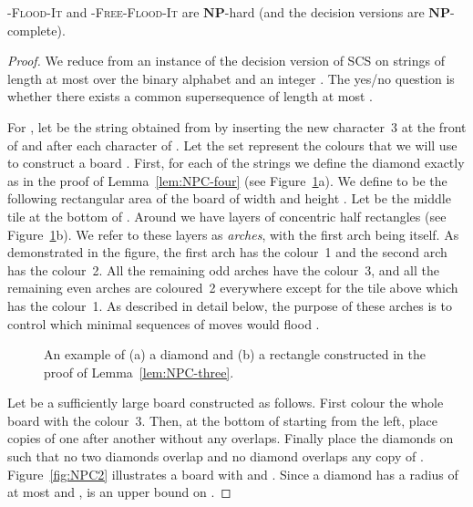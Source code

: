 \documentclass[a4paper,11pt]{llncs}
\newcommand{\pgfgraphic}[1]{}
\newcounter{l}
\newcommand{\NPtime}{\ensuremath{\mathbf{NP}}}
\newcommand{\Coloroid}[1]{-\textsc{Flood-It}}
\newcommand{\ColoroidFree}[1]{-\textsc{Free-Flood-It}}
\newcommand{\SCS}{\textsc{SCS}}
\newcommand{\recdim}[2]{}
\begin{document}
\begin{lemma}
    \label{lem:NPC-three}
    \Coloroid{3} and \ColoroidFree{3} are \NPtime-hard (and the decision versions are \NPtime-complete).
\end{lemma}
\begin{proof}
    We reduce from an instance of the decision version of \SCS{} on  strings  of length at most  over the binary alphabet  and an integer . The yes/no question is whether there exists a common supersequence of length at most .

    For , let  be the string obtained from  by inserting the new character~3 at the front of  and after each character of . Let the set  represent the colours that we will use to construct a board . First, for each of the  strings  we define the diamond  exactly as in the proof of Lemma~\ref{lem:NPC-four} (see Figure~\ref{fig:NPC}a). We define  to be the following rectangular area of the board of width  and height . Let  be the middle tile at the bottom of . Around  we have layers of concentric half rectangles (see Figure~\ref{fig:NPC}b). We refer to these layers as \emph{arches}, with the first arch being  itself. As demonstrated in the figure, the first arch has the colour~1 and the second arch has the colour~2. All the remaining odd arches have the colour~3, and all the remaining even arches are coloured~2 everywhere except for the tile above  which has the colour~1. As described in detail below, the purpose of these arches is to control which minimal sequences of moves would flood .


\begin{figure}[t]
\centering
	\pgfgraphic{graphic-npc}
\caption{ An example of (a) a diamond and (b) a rectangle constructed in the proof of Lemma~\ref{lem:NPC-three}.}
\label{fig:NPC}
\end{figure}

    Let  be a sufficiently large \recdim{n}{n} board constructed as follows. First colour the whole board with the colour~3. Then, at the bottom of  starting from the left, place  copies of  one after another without any overlaps. Finally place the  diamonds  on  such that no two diamonds overlap and no diamond overlaps any copy of . Figure~\ref{fig:NPC2} illustrates a board  with  and . Since a diamond has a radius of at most  and ,  is an upper bound on .


\end{proof}
\end{document}
